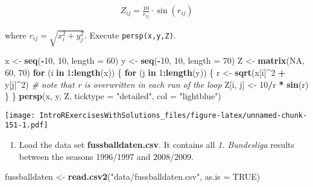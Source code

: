 \documentclass[]{article}
\newenvironment{Shaded}{\begin{snugshade}}{\end{snugshade}}
\newcommand{\KeywordTok}[1]{\textcolor[rgb]{0.13,0.29,0.53}{\textbf{#1}}}
\newcommand{\DataTypeTok}[1]{\textcolor[rgb]{0.13,0.29,0.53}{#1}}
\newcommand{\DecValTok}[1]{\textcolor[rgb]{0.00,0.00,0.81}{#1}}
\newcommand{\StringTok}[1]{\textcolor[rgb]{0.31,0.60,0.02}{#1}}
\newcommand{\CommentTok}[1]{\textcolor[rgb]{0.56,0.35,0.01}{\textit{#1}}}
\newcommand{\OtherTok}[1]{\textcolor[rgb]{0.56,0.35,0.01}{#1}}
\newcommand{\ControlFlowTok}[1]{\textcolor[rgb]{0.13,0.29,0.53}{\textbf{#1}}}
\newcommand{\OperatorTok}[1]{\textcolor[rgb]{0.81,0.36,0.00}{\textbf{#1}}}
\newcommand{\NormalTok}[1]{#1}
\providecommand{\tightlist}{%
  \setlength{\itemsep}{0pt}\setlength{\parskip}{0pt}}
\begin{document}
\begin{align*}
Z_{ij}=\frac{10}{r_{ij}}\cdot \sin (r_{ij})
\end{align*}

where \(r_{ij}=\sqrt{x_{i}^{2}+y_{j}^{2}}\). Execute
\texttt{persp(x,y,Z)}.

\begin{Shaded}
\begin{Highlighting}[]
\NormalTok{x <-}\StringTok{ }\KeywordTok{seq}\NormalTok{(}\OperatorTok{-}\DecValTok{10}\NormalTok{, }\DecValTok{10}\NormalTok{, }\DataTypeTok{length =} \DecValTok{60}\NormalTok{)}
\NormalTok{y <-}\StringTok{ }\KeywordTok{seq}\NormalTok{(}\OperatorTok{-}\DecValTok{10}\NormalTok{, }\DecValTok{10}\NormalTok{, }\DataTypeTok{length =} \DecValTok{70}\NormalTok{)}
\NormalTok{Z <-}\StringTok{ }\KeywordTok{matrix}\NormalTok{(}\OtherTok{NA}\NormalTok{, }\DecValTok{60}\NormalTok{, }\DecValTok{70}\NormalTok{)}
\ControlFlowTok{for}\NormalTok{ (i }\ControlFlowTok{in} \DecValTok{1}\OperatorTok{:}\KeywordTok{length}\NormalTok{(x)) \{}
    \ControlFlowTok{for}\NormalTok{ (j }\ControlFlowTok{in} \DecValTok{1}\OperatorTok{:}\KeywordTok{length}\NormalTok{(y)) \{}
\NormalTok{        r <-}\StringTok{ }\KeywordTok{sqrt}\NormalTok{(x[i]}\OperatorTok{^}\DecValTok{2} \OperatorTok{+}\StringTok{ }\NormalTok{y[j]}\OperatorTok{^}\DecValTok{2}\NormalTok{) }\CommentTok{# note that r is overwritten in each run of the loop}
\NormalTok{        Z[i, j] <-}\StringTok{ }\DecValTok{10}\OperatorTok{/}\NormalTok{r }\OperatorTok{*}\StringTok{ }\KeywordTok{sin}\NormalTok{(r)}
\NormalTok{    \}}
\NormalTok{\}}
\KeywordTok{persp}\NormalTok{(x, y, Z, }\DataTypeTok{ticktype =} \StringTok{"detailed"}\NormalTok{, }\DataTypeTok{col =} \StringTok{"lightblue"}\NormalTok{)}
\end{Highlighting}
\end{Shaded}

\texttt{[image: IntroRExercisesWithSolutions\_files/figure-latex/unnamed-chunk-151-1.pdf]}

\begin{enumerate}
\def\labelenumi{\arabic{enumi}.}
\setcounter{enumi}{2}
\tightlist
\item
  Load the data set \textbf{fussballdaten.csv}. It contains all \emph{1.
  Bundesliga} results between the seasons 1996/1997 and 2008/2009.
\end{enumerate}

\begin{Shaded}
\begin{Highlighting}[]
\NormalTok{fussballdaten <-}\StringTok{ }\KeywordTok{read.csv2}\NormalTok{(}\StringTok{"data/fussballdaten.csv"}\NormalTok{, }\DataTypeTok{as.is =} \OtherTok{TRUE}\NormalTok{)}
\end{Highlighting}
\end{Shaded}
\end{document}
